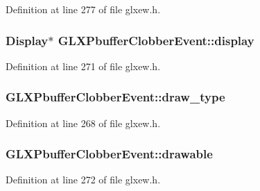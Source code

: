 Definition at line 277 of file glxew.\+h.

\hypertarget{struct_g_l_x_pbuffer_clobber_event_aeb49bb93cc59448e75d66170a39596d1}{}
\subsubsection[{display}]{\setlength{\rightskip}{0pt plus 5cm}Display$\ast$ G\+L\+X\+Pbuffer\+Clobber\+Event\+::display}\label{struct_g_l_x_pbuffer_clobber_event_aeb49bb93cc59448e75d66170a39596d1}


Definition at line 271 of file glxew.\+h.

\hypertarget{struct_g_l_x_pbuffer_clobber_event_a243f92b79d3cfbde73eab02815be2320}{}
\subsubsection[{draw\+\_\+type}]{ G\+L\+X\+Pbuffer\+Clobber\+Event\+::draw\+\_\+type}\label{struct_g_l_x_pbuffer_clobber_event_a243f92b79d3cfbde73eab02815be2320}


Definition at line 268 of file glxew.\+h.

\hypertarget{struct_g_l_x_pbuffer_clobber_event_a388908b766e35205c1a461ea8b60439f}{}
\subsubsection[{drawable}]{ G\+L\+X\+Pbuffer\+Clobber\+Event\+::drawable}\label{struct_g_l_x_pbuffer_clobber_event_a388908b766e35205c1a461ea8b60439f}


Definition at line 272 of file glxew.\+h.

\hypertarget{struct_g_l_x_pbuffer_clobber_event_a30d7162d8d77246b01f5e610cda4da68}{}

